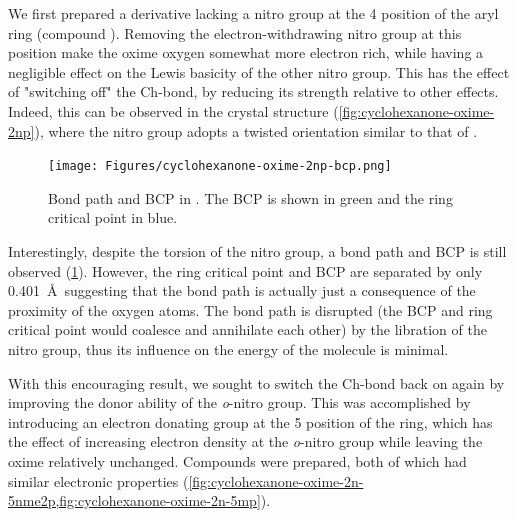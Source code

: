 \begin{refsection}
We first prepared a derivative lacking a nitro group at the 4 position of the aryl ring (compound ).
Removing the electron-withdrawing nitro group at this position make the oxime oxygen somewhat more electron rich, while having a negligible effect on the Lewis basicity of the other nitro group.
This has the effect of "switching off" the Ch-bond, by reducing its strength relative to other effects.
Indeed, this can be observed in the crystal structure (\cref{fig:cyclohexanone-oxime-2np}), where the nitro group adopts a twisted orientation similar to that of .

\begin{figure}
    \texttt{[image: Figures/cyclohexanone-oxime-2np-bcp.png]}
    \caption[Bond path and BCP in .]{Bond path and BCP in . The BCP is shown in green and the ring critical point in blue.}\label{fig:cyclohexanone-oxime-2np-bcp}
\end{figure}

Interestingly, despite the torsion of the nitro group, a bond path and BCP is still observed (\cref{fig:cyclohexanone-oxime-2np-bcp}).
However, the ring critical point and BCP are separated by only 0.401~\AA\ suggesting that the bond path is actually just a consequence of the proximity of the oxygen atoms.
The bond path is disrupted (the BCP and ring critical point would coalesce and annihilate each other) by the libration of the nitro group, thus its influence on the energy of the molecule is minimal.\autocite{Farrugia2006}

With this encouraging result, we sought to switch the Ch-bond back on again by improving the donor ability of the \emph{o}-nitro group.
This was accomplished by introducing an electron donating group at the 5 position of the ring, which has the effect of increasing electron density at the \emph{o}-nitro group while leaving the oxime relatively unchanged.
Compounds  were prepared, both of which had similar electronic properties (\cref{fig:cyclohexanone-oxime-2n-5nme2p,fig:cyclohexanone-oxime-2n-5mp}).


\end{refsection}
